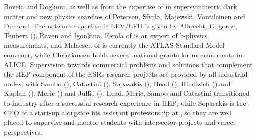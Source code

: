 Boveia and Doglioni, as well as from the expertise of in supersymmetric dark matter and new physics searches of Petersen, Sfyrla, 
Majewski, Voutilainen and Dunford. The network expertise in LFV/LFU is given by Albrecht, Gligorov, Teubert (\cernentity), Raven and Igonkina. 
Eerola of \helsinkientity is an expert of b-physics measurements,
and Malaescu of \cnrsentity is currently the ATLAS Standard Model convener, while Christiansen holds
several national grants for measurements in ALICE. 
%
Supervision towards commercial problems and solutions that complement the HEP component of the ESRs research projects 
are provided by all industrial nodes, with Sambo (\fleetmaticsentity), Catastini (\lightboxentity), Sopasakis (\ximantisentity), Head (\wildtreeentity),
Hindlzich (\cathientity) and Kaplan (\heidelberginstrumentsentity), Meric (\dqentity) and Julli\'{e} (\ibmentity). Head, Meric, Sambo and Catastini transitioned to
industry after a successful research experience in HEP, while Sopasakis is the CEO of a start-up alongside his
assistant professorship at \lundentity, so they are well placed to supervise and mentor students with intersector projects and career perspectives. 
%





